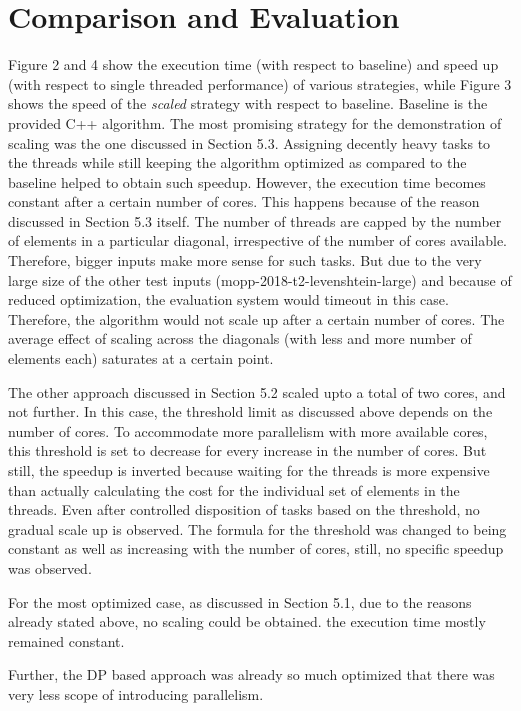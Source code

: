 \documentclass[a4paper,10pt,twoside]{article}
\begin{document}
\section{Comparison and Evaluation}

Figure 2 and 4 show the execution time (with respect to baseline) and speed up (with respect to single threaded performance) of various strategies, while Figure 3 shows the speed of the \textit{scaled} strategy with respect to baseline. Baseline is the provided C++ algorithm. The most promising strategy for the demonstration of scaling was the one discussed in Section 5.3. Assigning decently heavy tasks to the threads while still keeping the algorithm optimized as compared to the baseline helped to obtain such speedup. However, the execution time becomes constant after a certain number of cores. This happens because of the reason discussed in Section 5.3 itself. The number of threads are capped by the number of elements in a particular diagonal, irrespective of the number of cores available. Therefore, bigger inputs make more sense for such tasks. But due to the very large size of the other test inputs (mopp-2018-t2-levenshtein-large) and because of reduced optimization, the evaluation system would timeout in this case. Therefore, the algorithm would not scale up after a certain number of cores. The average effect of scaling across the diagonals (with less and more number of elements each) saturates at a certain point.

The other approach discussed in Section 5.2 scaled upto a total of two cores, and not further. In this case, the threshold limit as discussed above depends on the number of cores. To accommodate more parallelism with more available cores, this threshold is set to decrease for every increase in the number of cores. But still, the speedup is inverted because waiting for the threads is more expensive than actually calculating the cost for the individual set of elements in the threads. Even after controlled disposition of tasks based on the threshold, no gradual scale up is observed. The formula for the threshold was changed to being constant as well as increasing with the number of cores, still, no specific speedup was observed. 

For the most optimized case, as discussed in Section 5.1, due to the reasons already stated above, no scaling could be obtained. the execution time mostly remained constant. 

Further, the DP based approach was already so much optimized that there was very less scope of introducing parallelism.
\end{document}
